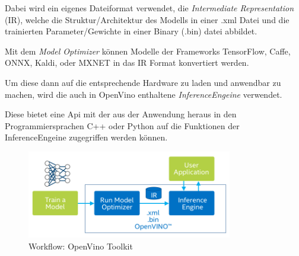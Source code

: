 Dabei wird ein eigenes Dateiformat verwendet, die \textit{Intermediate 
Representation} (IR), welche die Struktur/Architektur des Modells 
in einer .xml Datei und die trainierten Parameter/Gewichte in 
einer Binary (.bin) datei abbildet.

Mit dem \textit{Model Optimizer} können Modelle der Frameworks 
TensorFlow, Caffe, ONNX, Kaldi, oder MXNET in das IR Format 
konvertiert werden.

Um diese dann auf die entsprechende Hardware zu laden und anwendbar 
zu machen, wird die auch in OpenVino enthaltene
\textit{InferenceEngeine} verwendet.

Diese bietet eine Api mit der aus der Anwendung heraus in den 
Programmiersprachen C++ oder Python auf die Funktionen der 
InferenceEngeine zugegriffen werden können.

\begin{figure}[H]
    \centering
    \includegraphics[width=0.8\textwidth]{./Bilder/open_vino_workflow_steps.png}
    \caption{Workflow: OpenVino Toolkit}
    \label{img:openvinoworkflow}
\end{figure}
